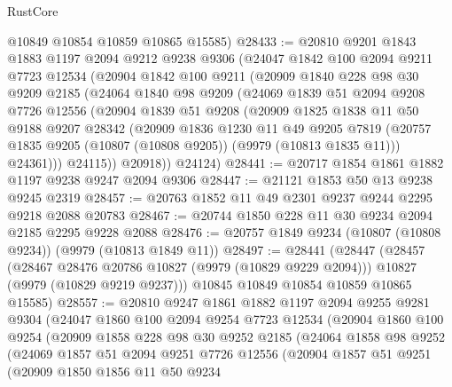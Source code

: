 \begin{lexlean}{RustCore}
\begin{coremodule}
      @10849
      @10854
      @10859
      @10865
      @15585)
@28433 := @20810
    @9201
    @1843
    @1883
    @1197
    @2094
    @9212
    @9238
    @9306
    (@24047
      @1842
      @100
      @2094
      @9211
      @7723
      @12534
      (@20904
        @1842
        @100
        @9211
        (@20909
          @1840
          @228
          @98
          @30
          @9209
          @2185
          (@24064
            @1840
            @98
            @9209
            (@24069
              @1839
              @51
              @2094
              @9208
              @7726
              @12556
              (@20904
                @1839
                @51
                @9208
                (@20909
                  @1825
                  @1838
                  @11
                  @50
                  @9188
                  @9207
                  @28342
                  (@20909
                    @1836
                    @1230
                    @11
                    @49
                    @9205
                    @7819
                    (@20757 @1835 @9205 (@10807 (@10808 @9205)) (@9979 (@10813 @1835 @11)))
                    @24361)))
              @24115))
          @20918))
      @24124)
@28441 := @20717 @1854 @1861 @1882 @1197 @9238 @9247 @2094 @9306
@28447 := @21121 @1853 @50 @13 @9238 @9245 @2319
@28457 := @20763 @1852 @11 @49 @2301 @9237 @9244 @2295 @9218 @2088 @20783
@28467 := @20744 @1850 @228 @11 @30 @9234 @2094 @2185 @2295 @9228 @2088
@28476 := @20757 @1849 @9234 (@10807 (@10808 @9234)) (@9979 (@10813 @1849 @11))
@28497 := @28441
    (@28447
      (@28457
        (@28467 @28476 @20786 @10827 (@9979 (@10829 @9229 @2094)))
        @10827
        (@9979 (@10829 @9219 @9237)))
      @10845
      @10849
      @10854
      @10859
      @10865
      @15585)
@28557 := @20810
    @9247
    @1861
    @1882
    @1197
    @2094
    @9255
    @9281
    @9304
    (@24047
      @1860
      @100
      @2094
      @9254
      @7723
      @12534
      (@20904
        @1860
        @100
        @9254
        (@20909
          @1858
          @228
          @98
          @30
          @9252
          @2185
          (@24064
            @1858
            @98
            @9252
            (@24069
              @1857
              @51
              @2094
              @9251
              @7726
              @12556
              (@20904
                @1857
                @51
                @9251
                (@20909
                  @1850
                  @1856
                  @11
                  @50
                  @9234

\end{coremodule}
\end{lexlean}
